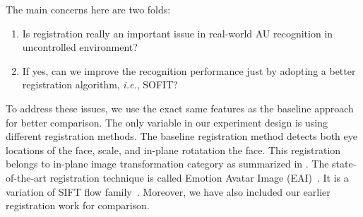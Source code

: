 \documentclass[10pt,journal]{IEEEtran}
\begin{document}
The main concerns here are two folds:
\begin{enumerate}
\item Is registration really an important issue in real-world AU recognition in uncontrolled environment?
\item If yes, can we improve the recognition performance just by adopting a better registration algorithm, \textit{i.e.}, SOFIT?
\end{enumerate}

To address these issues, we use the exact same features as the baseline approach for better comparison. The only variable in our experiment design is using different registration methods. The baseline registration method detects both eye locations of the face, scale, and in-plane rotatation the face. This registration belongs to in-plane image transformation category as summarized in \cite{Yang_SMCB12}. The state-of-the-art registration technique is called Emotion Avatar Image (EAI)~\cite{Yang_SMCB12}. It is a variation of SIFT flow family~\cite{Liu_PAMI11}. Moreover, we have also included our earlier registration work \cite{Yang_FG13} for comparison.
\end{document}
